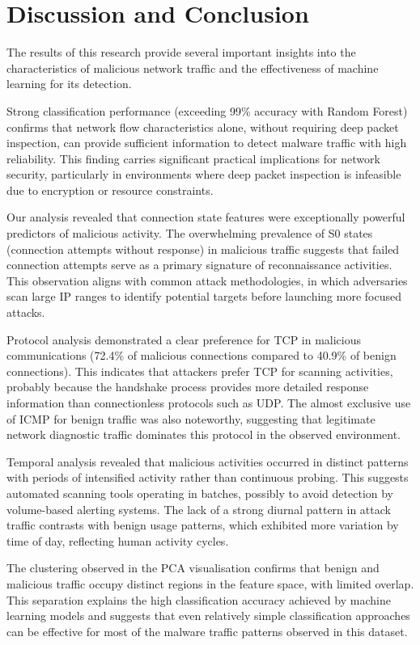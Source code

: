 \chapter{Discussion and Conclusion}

The results of this research provide several important insights into the characteristics of malicious network traffic and the effectiveness of machine learning for its detection.

Strong classification performance (exceeding 99\% accuracy with Random Forest) confirms that network flow characteristics alone, without requiring deep packet inspection, can provide sufficient information to detect malware traffic with high reliability. This finding carries significant practical implications for network security, particularly in environments where deep packet inspection is infeasible due to encryption or resource constraints.

Our analysis revealed that connection state features were exceptionally powerful predictors of malicious activity. The overwhelming prevalence of S0 states (connection attempts without response) in malicious traffic suggests that failed connection attempts serve as a primary signature of reconnaissance activities. This observation aligns with common attack methodologies, in which adversaries scan large IP ranges to identify potential targets before launching more focused attacks.

Protocol analysis demonstrated a clear preference for TCP in malicious communications (72.4\% of malicious connections compared to 40.9\% of benign connections). This indicates that attackers prefer TCP for scanning activities, probably because the handshake process provides more detailed response information than connectionless protocols such as UDP. The almost exclusive use of ICMP for benign traffic was also noteworthy, suggesting that legitimate network diagnostic traffic dominates this protocol in the observed environment.

Temporal analysis revealed that malicious activities occurred in distinct patterns with periods of intensified activity rather than continuous probing. This suggests automated scanning tools operating in batches, possibly to avoid detection by volume-based alerting systems. The lack of a strong diurnal pattern in attack traffic contrasts with benign usage patterns, which exhibited more variation by time of day, reflecting human activity cycles.

The clustering observed in the PCA visualisation confirms that benign and malicious traffic occupy distinct regions in the feature space, with limited overlap. This separation explains the high classification accuracy achieved by machine learning models and suggests that even relatively simple classification approaches can be effective for most of the malware traffic patterns observed in this dataset.

